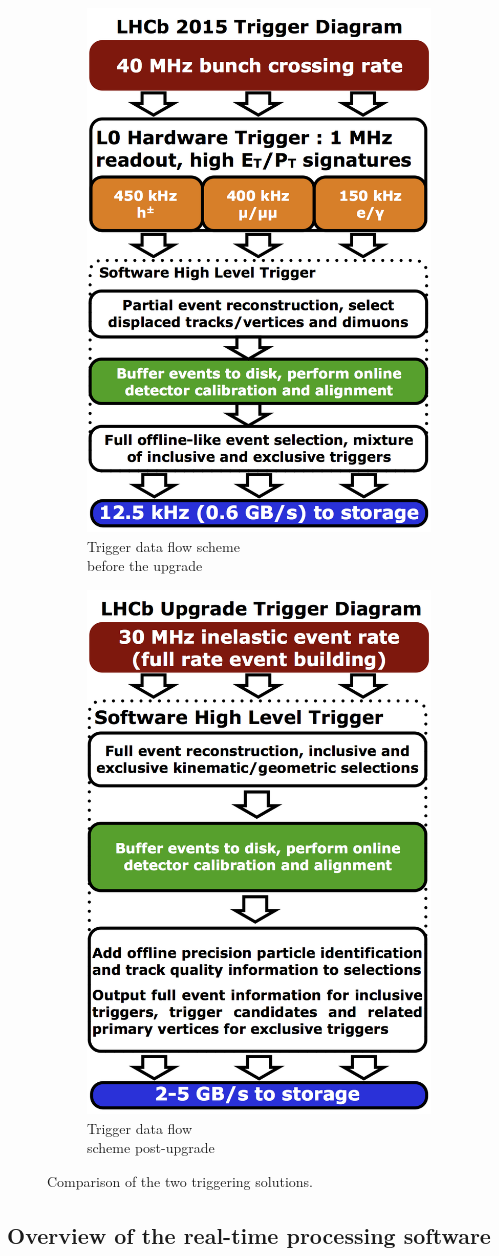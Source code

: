 \documentclass[12pt]{article}
\begin{document}
\begin{figure}[H]
	\centering
	\begin{subfigure}{.5\textwidth}
		\centering
		\includegraphics[width=.4\linewidth]{LHCb_Trigger_RunII_May2015}
		\caption{Trigger data flow scheme\\ before the upgrade}
		\label{fig_trigger_compare_sub1}
	\end{subfigure}%
	\begin{subfigure}{.5\textwidth}
		\centering
		\includegraphics[width=.4\linewidth]{LHCb_Trigger_RunIII_May2015}
		\caption{Trigger data flow\\ scheme post-upgrade}
		\label{fig_trigger_compare_sub2}
	\end{subfigure}
	\caption[Comparison of pre- and post-upgrade triggering]{Comparison of the two triggering solutions. \cite{lhcb_twiki}}
	\label{fig_trigger_compare}
\end{figure}


\subsection{Overview of the real-time processing software}\label{sec_reco_sw_overview}
	
\end{document}
